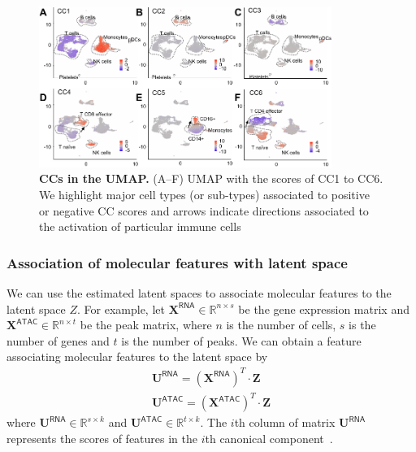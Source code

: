 \begin{figure}[!h]
	\centering
	\includegraphics[width=0.85\textwidth]{CC_UMAP/fig}
	\vspace{0.1cm}
	\caption[CCs in the UMAP.]{\textbf{CCs in the UMAP.} (A–F) UMAP with the scores of CC1 to CC6. We highlight major cell types (or sub-types) associated to positive or negative CC scores and arrows indicate directions associated to the activation of particular immune cells}
	\label{fig:CC_UMAP}
\end{figure}


\subsubsection{Association of molecular features with latent space}
We can use the estimated latent spaces to associate molecular features to the latent space $Z$. For example, let $\textbf{X}^{\mathsf{RNA}}\in \mathbb{R}^{n\times s}$ be the gene expression matrix and $\textbf{X}^{\mathsf{ATAC}}\in \mathbb{R}^{n\times t}$ be the peak matrix, where $n$ is the number of cells,  $s$ is the number of genes and $t$ is the number of peaks. We can obtain a feature associating molecular features to the latent space by
\begin{equation}
    \begin{split}
        \textbf{U}^{\mathsf{RNA}}=(\textbf{X}^{\mathsf{RNA}})^T \cdot \textbf{Z} \\
        \textbf{U}^{\mathsf{ATAC}}=(\textbf{X}^{\mathsf{ATAC}})^T \cdot \textbf{Z}
    \end{split}
\end{equation}
where $\textbf{U}^{\mathsf{RNA}}\in \mathbb{R}^{s\times k}$ and $\textbf{U}^{\mathsf{ATAC}}\in \mathbb{R}^{t \times k}$. The $i$th column of matrix $\textbf{U}^{\mathsf{RNA}}$ represents the scores of features in the $i$th canonical component~.

